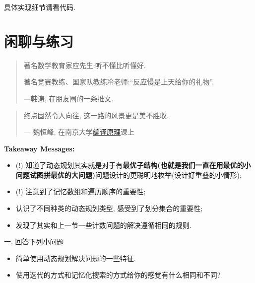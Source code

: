 具体实现细节请看代码. 

\section*{闲聊与练习}

\begin{quote}
    著名数学教育家应先生:听不懂比听懂好.

    著名竞赛教练、国家队教练冷老师:``反应慢是上天给你的礼物''.

    \hfill ---韩涛, 在朋友圈的一条推文.  
\end{quote}

\begin{quote}
    终点固然令人向往, 这一路的风景更是美不胜收. 

    \hfill --- 魏恒峰, 在南京大学\href{https://www.bilibili.com/video/BV1K24y1u7eA}{编译原理}课上
\end{quote}

\textbf{Takeaway Messages: }
\begin{itemize}
    \item (!) 知道了动态规划其实就是对于有\textbf{最优子结构(也就是我们一直在用最优的小问题试图拼最优的大问题)}问题设计的更聪明地枚举(设计好重叠的小情形);
    \item (!) 注意到了记忆数组和遍历顺序的重要性;
    \item 认识了不同种类的动态规划类型, 感受到了划分集合的重要性;
    \item 发现了其实和上一节一些计数问题的解决遵循相同的规则.
\end{itemize}


一. 回答下列小问题
\begin{itemize}[noitemsep]
    \item 简单使用动态规划解决问题的一些特征. 
    \item 使用迭代的方式和记忆化搜索的方式给你的感觉有什么相同和不同?
\end{itemize}
